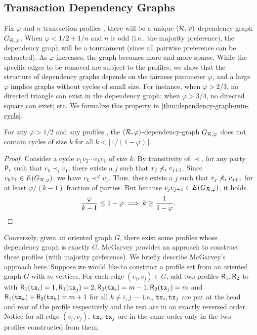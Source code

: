 \subsection{Transaction Dependency Graphs}
\label{subsec:graph-properties}

Fix $\varphi$ and $n$ transaction profiles \profileSet, there will be a unique $(\mathcal{R}, \varphi)$-dependency-graph $G_{\mathcal{R}, \varphi}$.
%
When $\varphi < 1 / 2 + 1 / n$ and $n$ is odd (i.e., the majority preference), the dependency graph will be a tournament (since all pairwise preference can be extracted).
%
As $\varphi$ increases, the graph becomes more and more sparse.
%
While the specific edges to be removed are subject to the profiles, we show that the structure of dependency graphs depends on the fairness parameter $\varphi$, and a large $\varphi$ implies graphs without cycles of small size.
%
For instance, when $\varphi > 2 / 3$, no directed triangle can exist in the dependency graph; when $\varphi > 3 / 4$, no directed square can exist; etc.
We formalize this property in \cref{thm:dependency-graph-min-cycle}.

\begin{theorem} \label{thm:dependency-graph-min-cycle}
    For any $\varphi > 1 / 2$ and any profiles \profileSet, the $(\mathcal{R}, \varphi)$-dependency-graph $G_{\mathcal{R}, \varphi}$ does not contain cycles of size $k$ for all $k < \lceil 1 / (1 - \varphi) \rceil$.
\end{theorem}

\begin{proof}
    Consider a cycle $v_1 v_2 \cdots v_k v_1$ of size $k$.
    By transitivity of $\prec$, for any party $\mathsf{P}_i$ such that $v_k \prec_i v_1$, there exists a $j$ such that $v_j \not\prec_i v_{j + 1}$.
    Since $v_k v_1 \in E(G_{\mathcal{R}, \varphi})$, we have $v_k \prec^\varphi v_1$.
    Thus, there exists a $j$ such that $v_j \not\prec_i v_{j + 1}$ for at
    least $\varphi / (k - 1)$ fraction of parties.
    But because $v_j v_{j + 1}\in E(G_{\mathcal{R}, \varphi})$, it holds
    \[ \frac \varphi {k - 1} \le 1 - \varphi \implies k \ge \frac 1 {1 - \varphi}. \qedhere \]
\end{proof}

Conversely, given an oriented graph $G$, there exist some profiles whose dependency graph is exactly $G$.
%
McGarvey \cite{McGarvey53} provides an approach to construct these profiles (with majority preference).
%
We briefly describe McGarvey's approach here.
%
Suppose we would like to construct a profile set \profileSet from an oriented graph $G$ with $m$ vertices.
%
For each edge $(v_i, v_j) \in G$, add two profiles $\mathsf{R}_1, \mathsf{R}_2$ to
\profileSet with $\mathsf{R}_1(\mathtt{tx}_i) = 1, \mathsf{R}_1(\mathtt{tx}_j) = 2, \mathsf{R}_2(\mathtt{tx}_i) = m - 1, \mathsf{R}_2(\mathtt{tx}_j) = m$ and $\mathsf{R}_1(\mathtt{tx}_k) + \mathsf{R}_2(\mathtt{tx}_k) = m + 1$ for all $k \neq i,j$ --- i.e., $\mathtt{tx}_i, \mathtt{tx}_j$ are put
at the head and rear of the profile respectively and the rest are in an exactly
reversed order.
%
Notice for all edge $(v_i, v_j)$, $\mathtt{tx}_i, \mathtt{tx}_j$ are in the same order only in the two profiles constructed from them.

